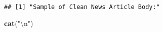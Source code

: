 \documentclass[]{article}
\newenvironment{Shaded}{\begin{snugshade}}{\end{snugshade}}
\newcommand{\KeywordTok}[1]{\textcolor[rgb]{0.13,0.29,0.53}{\textbf{#1}}}
\newcommand{\DecValTok}[1]{\textcolor[rgb]{0.00,0.00,0.81}{#1}}
\newcommand{\CharTok}[1]{\textcolor[rgb]{0.31,0.60,0.02}{#1}}
\newcommand{\StringTok}[1]{\textcolor[rgb]{0.31,0.60,0.02}{#1}}
\newcommand{\OperatorTok}[1]{\textcolor[rgb]{0.81,0.36,0.00}{\textbf{#1}}}
\newcommand{\NormalTok}[1]{#1}
\begin{document}
\begin{verbatim}
## [1] "Sample of Clean News Article Body:"
\end{verbatim}

\begin{Shaded}
\begin{Highlighting}[]
\KeywordTok{cat}\NormalTok{(}\StringTok{"}\CharTok{\textbackslash{}n}\StringTok{"}\NormalTok{)}
\end{Highlighting}
\end{Shaded}

\begin{Shaded}
\end{Shaded}
\end{document}
